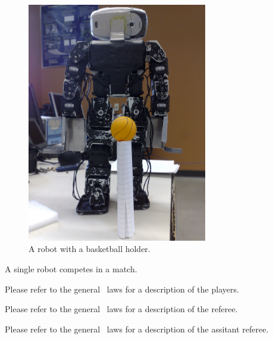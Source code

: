 \documentclass[12pt]{hurocup}
\begin{document}
\begin{lawlist}[BB]
 \begin{figure}
    \begin{center}
      \includegraphics[width=0.7\textwidth]{Figures/basketball-holder}
    \end{center}
    \caption{A robot with a basketball holder.}
    \label{fig:basketball-holder}
  \end{figure}

 \end{lawlist}


\begin{lawlist}[BB]
 \item A single robot competes in a match.
\end{lawlist}


Please refer to the general \HuroCup\ laws for a description of
the players.


Please refer to the general \HuroCup\ laws for a description of
the referee.


Please refer to the general \HuroCup\ laws for a description of
the assitant referee.

\end{document}
